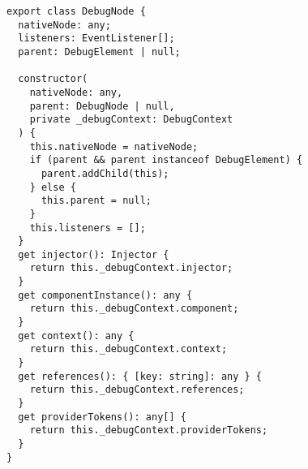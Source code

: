 \begin{verbatim}
export class DebugNode {
  nativeNode: any;
  listeners: EventListener[];
  parent: DebugElement | null;

  constructor(
    nativeNode: any,
    parent: DebugNode | null,
    private _debugContext: DebugContext
  ) {
    this.nativeNode = nativeNode;
    if (parent && parent instanceof DebugElement) {
      parent.addChild(this);
    } else {
      this.parent = null;
    }
    this.listeners = [];
  }
  get injector(): Injector {
    return this._debugContext.injector;
  }
  get componentInstance(): any {
    return this._debugContext.component;
  }
  get context(): any {
    return this._debugContext.context;
  }
  get references(): { [key: string]: any } {
    return this._debugContext.references;
  }
  get providerTokens(): any[] {
    return this._debugContext.providerTokens;
  }
}
\end{verbatim}
